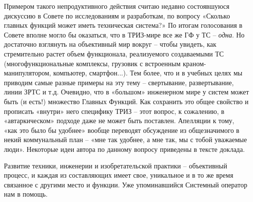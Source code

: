 \documentclass[11pt,a4paper]{article}
\begin{document}
Примером такого непродуктивного действия считаю недавно состоявшуюся дискуссию
в Совете по исследованиям и разработкам, по вопросу «Сколько главных функций
может иметь техническая система?» По итогам голосования в Совете вполне могло
бы оказаться, что в ТРИЗ-мире все же ГФ у ТС – \emph{одна}. Но достаточно
взглянуть на объективный мир вокруг – чтобы увидеть, как стремительно растет
объем функционала, реализуемого создаваемыми ТС (многофункциональные
комплексы, грузовик с встроенным краном-манипулятором, компьютер,
смартфон...).  Тем более, что и в учебных целях мы приводим самые разные
примеры на эту тему – свертывание, развертывание, линии ЗРТС и т.д.  Очевидно,
что в «большом» инженерном мире у систем может быть (и есть!) множество
Главных Функций. Как сохранить это общее свойство и прописать «внутри» него
специфику ТРИЗ – этот вопрос, к сожалению, в «автаркическом» подходе даже не
может быть поставлен. Апелляции к тому, «как это было бы удобнее» вообще
переводят обсуждение из общезначимого в некий коммунальный план – «мне так
удобнее, а мне так, мы с тобой уважаемые люди». Некоторые идеи автора по
данному вопросу приведены в тексте доклада.

Развитие техники, инженерии и изобретательской практики – объективный процесс,
и каждая из составляющих имеет свое, уникальное и в то же время связанное с
другими место и функции. Уже упоминавшийся Системный оператор нам в помощь.
\end{document}
